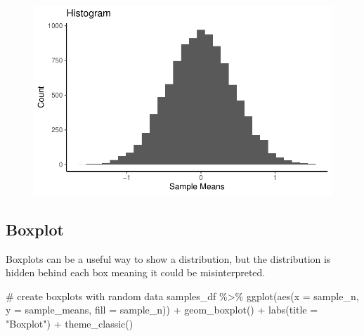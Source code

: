 \documentclass[
  letterpaper,
  DIV=11,
  numbers=noendperiod]{scrreprt}
\newenvironment{Shaded}{\begin{snugshade}}{\end{snugshade}}
\newcommand{\AttributeTok}[1]{\textcolor[rgb]{0.40,0.45,0.13}{#1}}
\newcommand{\CommentTok}[1]{\textcolor[rgb]{0.37,0.37,0.37}{#1}}
\newcommand{\FunctionTok}[1]{\textcolor[rgb]{0.28,0.35,0.67}{#1}}
\newcommand{\NormalTok}[1]{\textcolor[rgb]{0.00,0.23,0.31}{#1}}
\newcommand{\SpecialCharTok}[1]{\textcolor[rgb]{0.37,0.37,0.37}{#1}}
\newcommand{\StringTok}[1]{\textcolor[rgb]{0.13,0.47,0.30}{#1}}
\begin{document}
\begin{figure}[H]

{\centering \includegraphics{./visualizing-data_files/figure-pdf/unnamed-chunk-4-1.pdf}

}

\end{figure}

\hypertarget{boxplot}{%
\subsection{Boxplot}\label{boxplot}}

Boxplots can be a useful way to show a distribution, but the
distribution is hidden behind each box meaning it could be
misinterpreted.

\begin{Shaded}
\begin{Highlighting}[]
\CommentTok{\# create boxplots with random data}
\NormalTok{samples\_df }\SpecialCharTok{\%\textgreater{}\%}
  \FunctionTok{ggplot}\NormalTok{(}\FunctionTok{aes}\NormalTok{(}\AttributeTok{x =}\NormalTok{ sample\_n, }\AttributeTok{y =}\NormalTok{ sample\_means, }\AttributeTok{fill =}\NormalTok{ sample\_n)) }\SpecialCharTok{+}
  \FunctionTok{geom\_boxplot}\NormalTok{() }\SpecialCharTok{+}
  \FunctionTok{labs}\NormalTok{(}\AttributeTok{title =} \StringTok{"Boxplot"}\NormalTok{) }\SpecialCharTok{+}
  \FunctionTok{theme\_classic}\NormalTok{()}
\end{Highlighting}
\end{Shaded}
\end{document}
